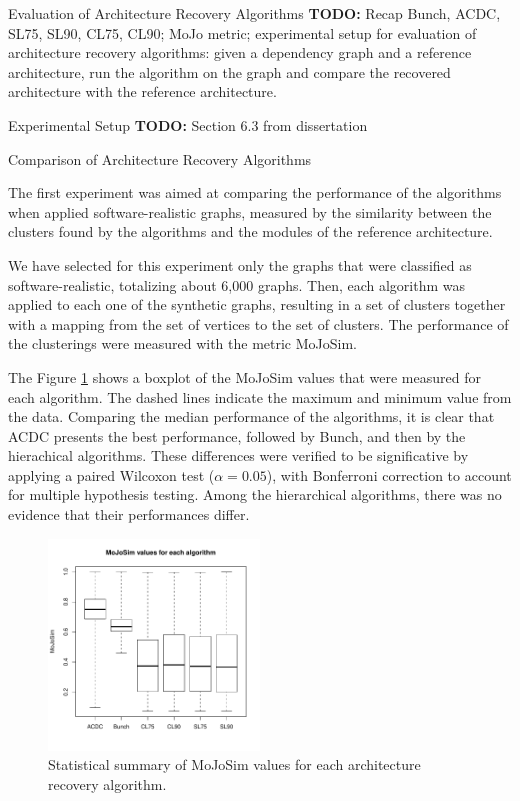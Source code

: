\documentclass[11pt,twocolumn,a4paper,english]{article}
\newcommand{\TODO}{\textbf{TODO:} }
\begin{document}

\begin{section}{Evaluation of Architecture Recovery Algorithms}
	\TODO Recap Bunch, ACDC, SL75, SL90, CL75, CL90; MoJo metric; experimental setup for evaluation of architecture recovery algorithms: given a dependency graph and a reference architecture, run the algorithm on the graph and compare the recovered architecture with the reference architecture.

\begin{subsection}{Experimental Setup}
	\TODO Section 6.3 from dissertation
	
\end{subsection}

\begin{subsection}{Comparison of Architecture Recovery Algorithms}
	
	The first experiment was aimed at comparing the performance of the algorithms when applied software-realistic graphs, measured by the similarity between the clusters found by the algorithms and the modules of the reference architecture.
	
	We have selected for this experiment only the graphs that were classified as software-realistic, totalizing about 6,000 graphs. Then, each algorithm was applied to each one of the synthetic graphs, resulting in a set of clusters together with a mapping from the set of vertices to the set of clusters. The performance of the clusterings were measured with the metric MoJoSim.
	
	The Figure \ref{fig:exp-algorithms} shows a boxplot of the MoJoSim values that were measured for each algorithm. The dashed lines indicate the maximum and minimum value from the data. Comparing the median performance of the algorithms, it is clear that ACDC presents the best performance, followed by Bunch, and then by the hierachical algorithms. These differences were verified to be significative by applying a paired Wilcoxon test ($\alpha = 0.05$), with Bonferroni correction to account for multiple hypothesis testing. Among the hierarchical algorithms, there was no evidence that their performances differ.
	
	\begin{figure}[htbp]
		\centering
			\includegraphics[width=0.5\textwidth]{figures/exp-algorithms}
		\caption{Statistical summary of MoJoSim values for each architecture recovery algorithm.}
		\label{fig:exp-algorithms}
	\end{figure}
	

\end{subsection}
\end{section}
\end{document}

